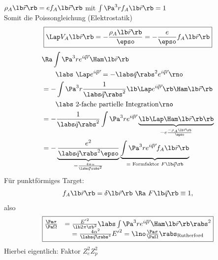 \begin{itemize}
\begin{itemize}
$\rho_A\lb \vec{r}\rb  = e f_A\lb \vec{r}\rb $ mit $\int \Pa^3 r f_A\lb \vec{r}\rb  = 1$\\
Somit die Poissongleichung (Elektrostatik)
\begin{align}
\boxed{\Lap V_A\lb \vec{r}\rb  = - \frac{\rho_A\lb \vec{r}\rb }{\epso} = -\frac{e}{\epso}f_A\lb \vec{r}\rb }
\end{align}
\begin{align*}
& \Ra \int \Pa^3 r e^{i \vec{q}\vec{r}} \Ham \lb \vec{r}\rb \\
&\qquad \labs\ \Lap e^{i \vec{q}\vec{r}} = - \labs \vec{q}\rabs^2 e^{i \vec{q}\vec{r}} \rno\\
& =  - \int \Pa^3 r \frac{1}{\labs\vec{q}\rabs^2} \lb  \Lap e^{i \vec{q}\vec{r}}\rb  \Ham\lb \vec{r}\rb \\
&\qquad \labs\ \text{2-fache partielle Integration} \rno \\
& = -\frac{1}{\labs \vec{q}\rabs ^2} \int \Pa^3 r e^{i\vec{q}\vec{r}} \underbrace{\lb  \Lap \Ham \lb \vec{r}\rb \rb }_{-e \frac{-\rho_A \lb \vec{r}\rb }{\epso}}\\
& = - \underbrace{\frac{e^2}{\labs \vec{q}\rabs^2 \epso}}_{=\frac{4\pi\alpha}{\labs \vec{q}\rabs^2}} \underbrace{\int \Pa^3 r e^{i\vec{q}\vec{r}} f_A\lb \vec{r}\rb }_\text{= Formfaktor $F\lb \vec{q}\rb $}
\end{align*}
Für punktförmiges Target:
\begin{align}
f_A \lb  \vec{r}\rb  = \delta \lb  \vec{r}\rb  \ \Ra \ F\lb \vec{q}\rb  \equiv 1,
\end{align}
also
\begin{align}
\boxed{ \begin{matrix}
\frac{\Pa \sigma}{\Pa \Omega} & = \frac{{E^\prime}^2}{\lb 2\pi\rb ^2} \labs \int \Pa^3 r e^{i\vec{q}\vec{r}}\Ham\lb \vec{r}\rb  \rabs^2\\
& = \frac{4 \alpha^2}{\labs \vec{q}\rabs^4}{E^\prime}^2 = \lno \frac{\Pa \sigma}{\Pa \Omega}\rabs_\text{Rutherford}
\end{matrix} }
\end{align}
Hierbei eigentlich: Faktor $Z_e^2 Z_p^2$


\end{itemize}
\end{itemize}
